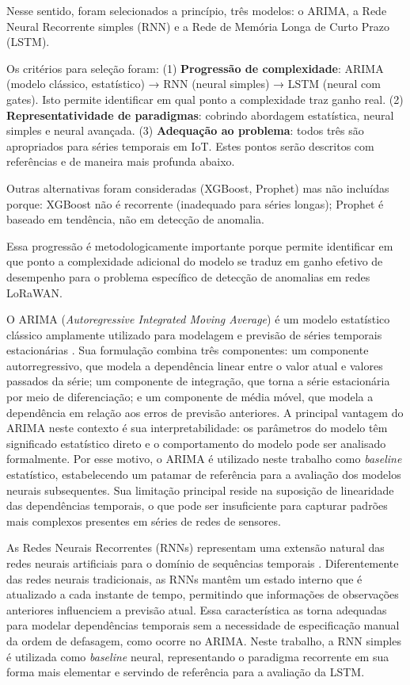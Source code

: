 Nesse sentido, foram selecionados a princípio, 
três modelos: o ARIMA, a Rede Neural Recorrente simples (RNN) e a Rede de 
Memória Longa de Curto Prazo (LSTM). 

Os critérios para seleção foram:
(1) \textbf{Progressão de complexidade}: ARIMA (modelo clássico, estatístico) 
→ RNN (neural simples) → LSTM (neural com gates). Isto permite identificar 
em qual ponto a complexidade traz ganho real.
(2) \textbf{Representatividade de paradigmas}: cobrindo abordagem 
estatística, neural simples e neural avançada.
(3) \textbf{Adequação ao problema}: todos três são apropriados para séries 
temporais em IoT.
Estes pontos serão descritos com referências e de maneira mais profunda abaixo.

Outras alternativas foram consideradas (XGBoost, Prophet) mas não incluídas 
porque: XGBoost não é recorrente (inadequado para séries longas); Prophet é 
baseado em tendência, não em detecção de anomalia.

Essa progressão é metodologicamente 
importante porque permite identificar em que ponto a complexidade adicional 
do modelo se traduz em ganho efetivo de desempenho para o problema específico 
de detecção de anomalias em redes LoRaWAN.

O ARIMA (\textit{Autoregressive Integrated Moving Average}) é um modelo 
estatístico clássico amplamente utilizado para modelagem e previsão de séries 
temporais estacionárias \cite{box2015}. Sua formulação combina três 
componentes: um componente autorregressivo, que modela a dependência linear 
entre o valor atual e valores passados da série; um componente de integração, 
que torna a série estacionária por meio de diferenciação; e um componente de 
média móvel, que modela a dependência em relação aos erros de previsão 
anteriores. A principal vantagem do ARIMA neste contexto é sua 
interpretabilidade: os parâmetros do modelo têm significado estatístico 
direto e o comportamento do modelo pode ser analisado formalmente. Por esse 
motivo, o ARIMA é utilizado neste trabalho como \textit{baseline} estatístico, 
estabelecendo um patamar de referência para a avaliação dos modelos neurais 
subsequentes. Sua limitação principal reside na suposição de linearidade das 
dependências temporais, o que pode ser insuficiente para capturar padrões 
mais complexos presentes em séries de redes de sensores.

As Redes Neurais Recorrentes (RNNs) representam uma extensão natural das 
redes neurais artificiais para o domínio de sequências temporais 
\cite{rumelhart1986}. Diferentemente das redes neurais tradicionais, as RNNs 
mantêm um estado interno que é atualizado a cada instante de tempo, 
permitindo que informações de observações anteriores influenciem a previsão 
atual. Essa característica as torna adequadas para modelar dependências 
temporais sem a necessidade de especificação manual da ordem de defasagem, 
como ocorre no ARIMA. Neste trabalho, a RNN simples é utilizada como 
\textit{baseline} neural, representando o paradigma recorrente em sua forma 
mais elementar e servindo de referência para a avaliação da LSTM.

